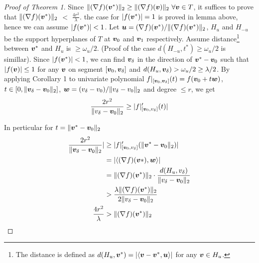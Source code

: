 {\begin{proof}[Proof of Theorem 1]
Since $\|(\nabla f)(\bm v^*)\|_2 \ge \|(\nabla f)(\bm v)\|_2\ \forall \bm v \in T$, it suffices to prove that $\|(\nabla f)(\bm v^*)\|_2$ $<$ $\frac{4r^2}{\lambda}$. the case for $|f(\bm v^*)|=1$ is proved in lemma above, hence we can assume $|f(\bm v^*)| < 1$. Let $\bm u=(\nabla f)(\bm v^*)/\|(\nabla f)(\bm v^*)\|_2$, $H_u$ and $H_{-u}$ be the support hyperplanes of $T$ at $\bm v_0$ and $\bm v_1$ respectively. Assume distance\footnote{The distance is defined as $d(H_u,\bm v^*) = |\langle \bm v-\bm v^*,\bm u \rangle|$ for  any $\bm v \in H_u$.} between $\bm v^*$ and $H_u$ is $\ge \omega_u/2$. (Proof of the case $d(H_{-u},t^*) \ge \omega_u / 2$ is simillar). Since $|f(\bm v^*)|<1$, we can find $\bm v_\delta$ in the direction of $\bm v^*-\bm v_0$ such that $|f(\bm v)| \le 1$ for any $\bm v$ on segment $[\bm v_0,\bm v_\delta]$ and $d(H_u,\bm v_\delta) > \omega_u/2 \ge \lambda/2$. By applying Corollary 1 to univariate polynomial $f|_{[\bm v_0,\bm v_\delta]}(t) = f(\bm v_0+t\bm w)$, $t \in [0,\|\bm v_\delta-\bm v_0\|_2]$, $\bm w=(v_\delta-v_0)/\|v_\delta-v_0\|_2$ and degree $\le r$, we get
$$\frac{2r^2}{\|v_\delta-\bm v_0\|_2} \ge |f|_{[\bm v_0,v_\delta]}'(t)|$$

In perticular for $t = \|\bm v^*-\bm v_0\|_2$ 
\begin{align*}
\frac{2r^2}{\|\bm v_\delta-\bm v_0\|_2}| &\ge |f|_{[\bm v_0,v_\delta]}'(\|\bm v^*-\bm v_0\|_2)|\\
&=|\langle(\nabla f)(\bm v*),\bm w\rangle|\\
&=\|(\nabla f)(\bm v^*)\|_2\cdot \frac{d(H_u,v_\delta)}{\|v_\delta-\bm v_0\|_2}\\
&>\frac{\lambda \|(\nabla f)(\bm v^*)\|_2}{2\|v_\delta-\bm v_0\|_2}\\
\frac{4r^2}{\lambda} &> \|(\nabla f)(\bm v^*)\|_2
\end{align*}
\end{proof}
}
